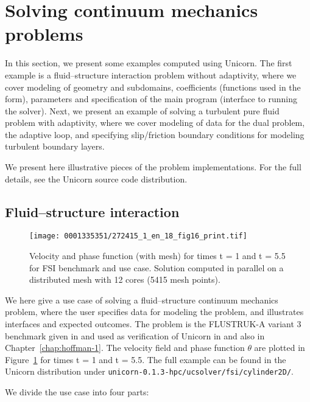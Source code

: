 \section{Solving continuum mechanics problems}

In this section, we present some examples computed using Unicorn.  The
first example is a fluid--structure interaction problem without
adaptivity, where we cover modeling of geometry and subdomains,
coefficients (functions used in the form), parameters and
specification of the main program (interface to running the
solver). Next, we present an example of solving a turbulent pure fluid
problem with adaptivity, where we cover modeling of data for the dual
problem, the adaptive loop, and specifying slip/friction boundary
conditions for modeling turbulent boundary layers.

We present here illustrative pieces of the problem
implementations. For the full details, see the Unicorn source code
distribution.

\subsection{Fluid--structure interaction}

\begin{figure}[!t]
\centering
\texttt{[image: 0001335351/272415\_1\_en\_18\_fig16\_print.tif]}
\caption{Velocity and phase function (with mesh) for times t = 1 and t = 5.5 for FSI benchmark and use case. Solution computed in parallel on a distributed mesh with 12 cores (5415 mesh points).}\label{fig:fsi2D_plot2}\vspace*{6pt}
\end{figure}

We here give a use case of solving a fluid--structure continuum
mechanics problem, where the user specifies data for modeling the
problem, and illustrates interfaces and expected outcomes. The problem
is the FLUSTRUK-A variant 3 benchmark given in \citep{HronTurek2005}
and used as verification of Unicorn
in \citep{HoffmanJanssonStockli2011} and also in
Chapter~\ref{chap:hoffman-1}. The velocity field and phase function
$\theta$ are plotted in Figure~\ref{fig:fsi2D_plot2} for times t = 1
and t = 5.5. The full example can be found in the Unicorn distribution
under {\tt unicorn-0.1.3-hpc/ucsolver/fsi/cylinder2D/}.

We divide the use case into four parts:

